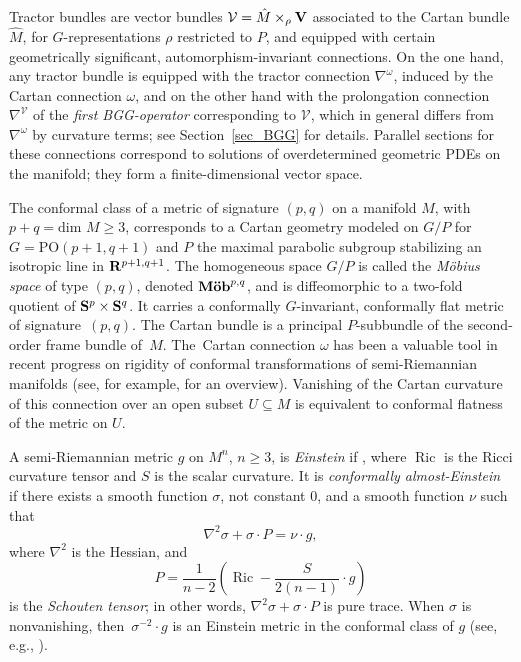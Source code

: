 \documentclass[10pt,a4paper]{amsart}
\numberwithin{equation}{section}
\theoremstyle{definition}
\newcommand{\BR}{{\bf R}}
\begin{document}
Tractor bundles are vector bundles {$\mathcal{V} = \hat{M} \times_\rho {\bf V}$} associated to the Cartan bundle
$\hat{M}$, for $G$-representations $\rho$ restricted to $P$, and equipped
with certain geometrically significant, automorphism-invariant connections.
On the one hand, any tractor bundle is equipped with the tractor connection $\nabla^\omega$, induced by the Cartan connection $\omega$,
and on the other hand with the prolongation connection $\nabla^{\mathcal V}$ of the \emph{first BGG-operator} corresponding to $\mathcal V$, which
in general differs from $\nabla^\omega$ by curvature terms; see Section~\ref{sec_BGG} for details. Parallel sections for these connections correspond to solutions of overdetermined
geometric PDEs
on the manifold; they form a finite-dimensional vector space.

The conformal class of a metric of signature $(p,q)$ on a manifold
$M$, with $p+q = \mbox{dim } M \geq 3$, corresponds to a Cartan geometry
modeled on $G/P$ for $G = \mbox{PO}(p+1,q+1)$ and $P$ the maximal
parabolic subgroup stabilizing an isotropic line in $\BR^{p+1,q+1}$.
The homogeneous space $G/P$ is called the \emph{M\"obius space} of
type $(p,q)$, denoted $\mbox{\bf M\"ob}^{p,q}$, and is diffeomorphic to a two-fold quotient of ${\bf S}^p \times {\bf S}^q$. It carries a
conformally $G$-invariant, conformally flat metric of signature~$(p,q)$. The Cartan
bundle is a principal $P$-subbundle of the second-order frame bundle
of~$M$. The~Cartan connection $\omega$ has been a valuable tool
in recent progress on rigidity of conformal transformations of
semi-Riemannian manifolds (see, for example, \cite{me.notices} for an
overview). Vanishing of the Cartan curvature of this connection over an
open subset $U \subseteq M$ is equivalent to conformal flatness of the
metric on $U$.

A semi-Riemannian metric $g$ on $M^n$, $n \geq 3$, is \emph{Einstein}
if , where $\operatorname{Ric}$ is the Ricci
curvature tensor and $S$ is the scalar curvature.
It is \emph{conformally almost-Einstein} if there exists a
smooth function $\sigma$, not constant $0$, and a smooth function $\nu$ such that
\begin{equation}
\label{eqn.conf.einstein}
 \nabla^2 \sigma + \sigma \cdot P = \nu \cdot g,
 \end{equation}
 where $\nabla^2$ is the Hessian, and
 \[
 P = \frac{1}{n-2} \left( \operatorname{Ric} - \frac{S}{2(n-1)} \cdot g \right)
 \]
is the \emph{Schouten tensor}; in other words, $\nabla^2 \sigma +
\sigma \cdot P$ is pure trace. When $\sigma$ is nonvanishing,
then~${\sigma^{-2} \cdot g}$ is an Einstein metric in the conformal class of $g$
(see, e.g., \cite[Proposition~3.6]{curry.gover.tractors}).
\end{document}
